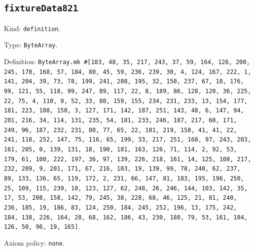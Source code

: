 \documentclass[11pt]{article}
\begin{document}
\subsection*{\texttt{fixtureData821}}
\noindent Kind: \texttt{definition}.\par
\noindent Type: \texttt{ByteArray}.\par
\noindent Definition: \texttt{ByteArray.mk \#[183, 48, 35, 217, 243, 37, 59, 164, 126, 200, 245, 170, 168, 57, 184, 80, 45, 59, 236, 239, 30, 4, 124, 167, 222, 1, 141, 204, 39, 73, 78, 199, 241, 208, 195, 32, 150, 237, 67, 18, 176, 99, 121, 55, 118, 99, 247, 89, 117, 22, 8, 189, 86, 128, 120, 36, 225, 22, 75, 4, 110, 9, 52, 33, 80, 159, 155, 234, 231, 233, 13, 154, 177, 181, 223, 108, 150, 3, 127, 171, 142, 187, 251, 143, 48, 6, 147, 94, 201, 216, 34, 114, 131, 235, 54, 181, 233, 246, 187, 217, 60, 171, 249, 96, 187, 232, 231, 80, 77, 65, 22, 101, 219, 158, 41, 41, 22, 241, 118, 252, 147, 75, 116, 65, 199, 33, 217, 251, 168, 97, 243, 203, 161, 205, 0, 139, 131, 18, 190, 181, 163, 126, 71, 114, 2, 92, 53, 179, 61, 100, 222, 197, 36, 97, 139, 226, 218, 161, 14, 125, 108, 217, 232, 209, 9, 201, 171, 67, 216, 103, 19, 139, 99, 78, 240, 62, 237, 89, 133, 136, 65, 119, 172, 2, 231, 66, 147, 81, 183, 195, 196, 250, 25, 109, 115, 239, 10, 123, 127, 62, 248, 26, 246, 144, 103, 142, 35, 17, 53, 208, 158, 142, 79, 245, 38, 228, 68, 46, 125, 21, 81, 240, 236, 185, 19, 186, 83, 124, 250, 184, 245, 252, 196, 13, 175, 242, 184, 138, 226, 164, 28, 68, 162, 186, 43, 230, 180, 79, 53, 161, 104, 126, 50, 96, 19, 165]}.\par
\noindent Axiom policy: \texttt{none}.\par
\end{document}
